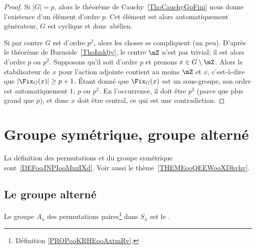 \begin{proof}
    Si \( | G |=p\), alors le théorème de Cauchy~\ref{ThoCauchyGpFini} nous donne l'existence d'un élément d'ordre \( p\). Cet élément est alors automatiquement générateur, \( G\) est cyclique et donc abélien.

    Si par contre \( G\) est d'ordre \( p^2\), alors les choses se compliquent (un peu). D'après le théorème de Burnside~\ref{ThoImkljy}, le centre \( \mZ\) n'est pas trivial; il est alors d'ordre \( p\) ou \( p^2\). Supposons qu'il soit d'ordre \( p\) et prenons \( x\in G\setminus\mZ\). Alors le stabilisateur de \( x\) pour l'action adjointe contient au moins \( \mZ\) et \( x\), c'est-à-dire que \( |\Fix_G(x)|\geq p+1\). Étant donné que \( \Fix_G(x)\) est un sous-groupe, son ordre est automatiquement \( 1\), \( p\) ou \( p^2\). En l'occurrence, il doit être \( p^2\) (parce que plus grand que \( p\)), et donc \( x\) doit être central, ce qui est une contradiction.
\end{proof}

\section{Groupe symétrique, groupe alterné}
\label{SECooZFYQooFfopMa}

La définition des permutations et du groupe symétrique sont~\ref{DEFooJNPIooMuzIXd}. Voir aussi le thème~\ref{THEMEooQEEWooXDhvhv}.

\subsection{Le groupe alterné}

\begin{definition}      \label{DEFooEIVIooFvVkHH}
    Le groupe \( A_n\) des permutations paires\footnote{Définition \ref{PROPooKRHEooAxtmRv}.} dans \( S_n\) est le .
\end{definition}

